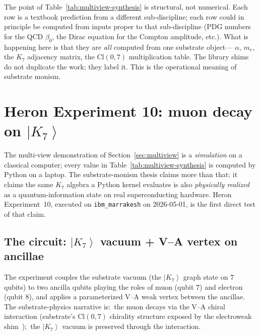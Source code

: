 \documentclass[11pt]{article}
\newcommand{\ket}[1]{\left|#1\right\rangle}
\newcommand{\me}{m_e}
\begin{document}
The point of Table~\ref{tab:multiview-synthesis} is structural,
not numerical.  Each row is a textbook prediction from a different
sub-discipline; each row could in principle be computed from
inputs proper to that sub-discipline (PDG numbers for the QCD
$\beta_0$, the Dirac equation for the Compton amplitude, etc.).
What is happening here is that they are \emph{all} computed from
one substrate object--- $\alpha$, $\me$, the $K_7$ adjacency
matrix, the $\mathrm{Cl}(0,7)$ multiplication table.  The library
shims do not duplicate the work; they label it.  This is the
operational meaning of substrate monism.

\section{Heron Experiment 10: muon decay on $\ket{K_7}$}
\label{sec:heron}

The multi-view demonstration of Section~\ref{sec:multiview} is a
\emph{simulation} on a classical computer; every value in
Table~\ref{tab:multiview-synthesis} is computed by Python on a
laptop.  The substrate-monism thesis claims more than that: it
claims the same $K_7$ algebra a Python kernel evaluates is also
\emph{physically realized} as a quantum-information state on real
superconducting hardware.  Heron Experiment~10, executed on
\texttt{ibm\_marrakesh} on 2026-05-01, is the first direct test
of that claim.

\subsection{The circuit: $\ket{K_7}$ vacuum + V--A vertex on ancillae}

The experiment couples the substrate vacuum (the $\ket{K_7}$
graph state on $7$ qubits) to two ancilla qubits playing the roles
of muon (qubit $7$) and electron (qubit $8$), and applies a
parameterized V--A weak vertex between the ancillae.  The
substrate-physics narrative is:\ the muon decays via the V--A
chiral interaction (substrate's $\mathrm{Cl}(0,7)$ chirality
structure exposed by the electroweak
shim~\cite{paper17});\ the $\ket{K_7}$ vacuum is preserved
through the interaction.
\end{document}
